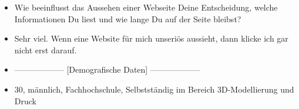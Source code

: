 {\begin{itemize}[]
              Man sieht gut wie Artikel zusammenhängen und diese Möglichkeit gibt es bei der Liste nicht.
        \item {} Wie beeinflusst das Aussehen einer Webseite Deine Entscheidung, welche Informationen Du liest und wie lange Du auf der Seite bleibst?
        \item {} Sehr viel.
              Wenn eine Website für mich unseriös aussieht, dann klicke ich gar nicht erst darauf.
        \item {------------------} [Demografische Daten] {------------------}
        \item {} 30, männlich, Fachhochschule, Selbstständig im Bereich 3D-Modellierung und Druck
    \end{itemize}}
\nolinenumbers
